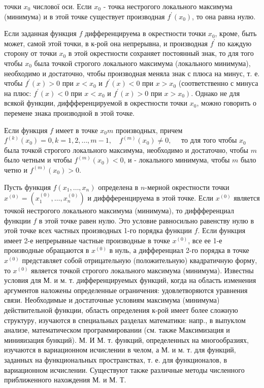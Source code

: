 \documentclass[10pt]{article}
\begin{document}
точки $x_{0}$ числової оси. Если $x_{0}$ - точка нестрогого локального максимума (минимума) и в этой точке существует производная $f^{\prime}\left(x_{0}\right)$, то она равна нулю.



Если заданная функция $f$ дифференцируема в окрестности точки $x_{0}$, кроме, быть может, самой этой точки, в к-рой она непрерывна, и производная $f^{\prime}$ по каждую сторону от точки $x_{0}$ в этой окрестности сохраняет постоянный знак, то для того чтобы $x_{0}$ была точкой строгого локального максимума (локального минимума), необходимо и достаточно, чтобы производная меняла знак с плюса на минус, т. е. чтобы $f^{\prime}(x)>0$ при $x<x_{0}$ и $f^{\prime}(x)<0$ при $x>x_{0}$ (соответственно с минуса на плюс: $f^{\prime}(x)<0$ при $x<x_{0}$ и $f^{\prime}(x)>0$ при $\left.x>x_{0}\right)$. Однако не для всякой функции, диффференцируемой в окрестности точки $x_{0}$, можно говорить о перемене знака производной в этой точке.



Если функция $f$ имеет в точке $x_{0} m$ производных, причем $f^{(k)}\left(x_{0}\right)=0, k=1,2, \ldots, m-1, \quad f^{(m)}\left(x_{0}\right) \neq 0, \quad$ то для того чтобы $x_{0}$ была точкой строгого локального максимума, необходимо и достаточно, чтобы $m$ было четным и чтобы $f^{(m)}\left(x_{0}\right)<0$, и - локального минимума, чтобы $m$ было четно и $f^{(m)}\left(x_{0}\right)>0$.



Пусть функция $f\left(x_{1}, \ldots, x_{n}\right)$ определена в $n$-мерной окрестности точки $x^{(0)}=\left(x_{1}^{(0)}, \ldots, x_{n}^{(0)}\right)$ и диффференцируема в этой точке. Если $x^{(0)}$ является точкой нестрогого локального максимума (минимума), то диффференциал функции $f$ в этой точке равен нулю. Это условие равносильно равенству нулю в этой точке всех частных производных 1-го порядка функции $f$. Если функция имеет 2-е непрерывные частные производные в точке $x^{(0)}$, все ее 1-е производные обращаются в $x^{(0)}$ в нуль, а дифференциал 2-го порядка в точке $x^{(0)}$ представляет собой отрицательную (положительную) квадратичную форму, то $x^{(0)}$ является точкой строгого локального максимума (минимума). Известны условия для М. и м. т. дифференцируемых функций, когда на область изменения аргументов наложены определенные ограничения: удовлетворяются уравнения связи. Необходимые и достаточные условиям максимума (минимума) действительной функции, область определения к-рой имеет более сложную структуру, изучаются в специальных разделах математики: напр., в выпуклом анализе, математическом программировании (см. также Максимизация $и$ минияизация бункций). М. И М. т. функций, определенных на многообразиях, изучаются в вариационном исчислении в челом, а М. и м. т. для функций, заданных на функциональных пространствах, т. е. для функционалов, в вариационном исчислении. Существуют также различные методы численного приближенного нахождения М. и М. Т.
\end{document}
